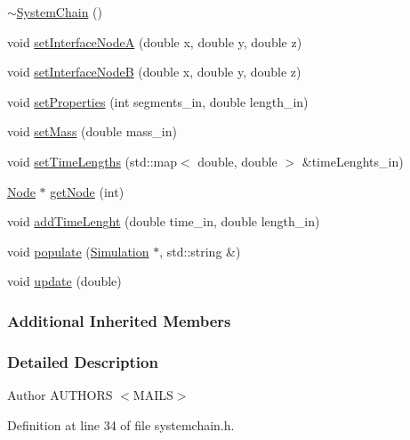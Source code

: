 \begin{DoxyCompactItemize}
\item 
\hyperlink{classmknix_1_1_system_chain_a1cf65bbe0b9f8ce2dc6d24eebff0d93c}{$\sim$\+System\+Chain} ()
\item 
void \hyperlink{classmknix_1_1_system_chain_aa82626e78fb83ddee9114e7d7b7df34a}{set\+Interface\+Node\+A} (double x, double y, double z)
\item 
void \hyperlink{classmknix_1_1_system_chain_a3f331ac3848bbedef2bea718489b9ee6}{set\+Interface\+Node\+B} (double x, double y, double z)
\item 
void \hyperlink{classmknix_1_1_system_chain_a571be0a127e9a3eee1c6e5609b083a5d}{set\+Properties} (int segments\+\_\+in, double length\+\_\+in)
\item 
void \hyperlink{classmknix_1_1_system_chain_a005f33286a77d8492d164eef69cf2798}{set\+Mass} (double mass\+\_\+in)
\item 
void \hyperlink{classmknix_1_1_system_chain_a0add7512af477795f9cc7ef0ff39e1ec}{set\+Time\+Lengths} (std\+::map$<$ double, double $>$ \&time\+Lenghts\+\_\+in)
\item 
\hyperlink{classmknix_1_1_node}{Node} $\ast$ \hyperlink{classmknix_1_1_system_chain_aadbbf4c636dbb95a7e7be10d5904b51c}{get\+Node} (int)
\item 
void \hyperlink{classmknix_1_1_system_chain_aa4d8adf858228a1f3d5742f394c77187}{add\+Time\+Lenght} (double time\+\_\+in, double length\+\_\+in)
\item 
void \hyperlink{classmknix_1_1_system_chain_a5d35273a452ece7b04251ab206c2b63d}{populate} (\hyperlink{classmknix_1_1_simulation}{Simulation} $\ast$, std\+::string \&)
\item 
void \hyperlink{classmknix_1_1_system_chain_a9ccb93db731aa96bae11540b035afa18}{update} (double)
\end{DoxyCompactItemize}
\subsubsection*{Additional Inherited Members}


\subsubsection{Detailed Description}
\begin{DoxyAuthor}{Author}
A\+U\+T\+H\+O\+R\+S $<$\+M\+A\+I\+L\+S$>$ 
\end{DoxyAuthor}


Definition at line 34 of file systemchain.\+h.



